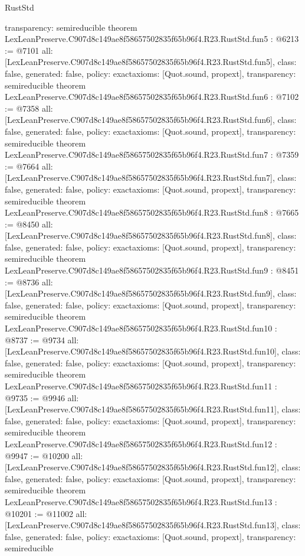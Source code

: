 \begin{lexlean}{RustStd}
\begin{coremodule}
{  transparency: semireducible
}
theorem LexLeanPreserve.C907d8c149ae8f58657502835f65b96f4.R23.RustStd.fun5 : @6213 := @7101 {
  all: [LexLeanPreserve.C907d8c149ae8f58657502835f65b96f4.R23.RustStd.fun5],
  class: false,
  generated: false,
  policy: exact{axioms: [Quot.sound, propext]},
  transparency: semireducible
}
theorem LexLeanPreserve.C907d8c149ae8f58657502835f65b96f4.R23.RustStd.fun6 : @7102 := @7358 {
  all: [LexLeanPreserve.C907d8c149ae8f58657502835f65b96f4.R23.RustStd.fun6],
  class: false,
  generated: false,
  policy: exact{axioms: [Quot.sound, propext]},
  transparency: semireducible
}
theorem LexLeanPreserve.C907d8c149ae8f58657502835f65b96f4.R23.RustStd.fun7 : @7359 := @7664 {
  all: [LexLeanPreserve.C907d8c149ae8f58657502835f65b96f4.R23.RustStd.fun7],
  class: false,
  generated: false,
  policy: exact{axioms: [Quot.sound, propext]},
  transparency: semireducible
}
theorem LexLeanPreserve.C907d8c149ae8f58657502835f65b96f4.R23.RustStd.fun8 : @7665 := @8450 {
  all: [LexLeanPreserve.C907d8c149ae8f58657502835f65b96f4.R23.RustStd.fun8],
  class: false,
  generated: false,
  policy: exact{axioms: [Quot.sound, propext]},
  transparency: semireducible
}
theorem LexLeanPreserve.C907d8c149ae8f58657502835f65b96f4.R23.RustStd.fun9 : @8451 := @8736 {
  all: [LexLeanPreserve.C907d8c149ae8f58657502835f65b96f4.R23.RustStd.fun9],
  class: false,
  generated: false,
  policy: exact{axioms: [Quot.sound, propext]},
  transparency: semireducible
}
theorem LexLeanPreserve.C907d8c149ae8f58657502835f65b96f4.R23.RustStd.fun10 : @8737 := @9734 {
  all: [LexLeanPreserve.C907d8c149ae8f58657502835f65b96f4.R23.RustStd.fun10],
  class: false,
  generated: false,
  policy: exact{axioms: [Quot.sound, propext]},
  transparency: semireducible
}
theorem LexLeanPreserve.C907d8c149ae8f58657502835f65b96f4.R23.RustStd.fun11 : @9735 := @9946 {
  all: [LexLeanPreserve.C907d8c149ae8f58657502835f65b96f4.R23.RustStd.fun11],
  class: false,
  generated: false,
  policy: exact{axioms: [Quot.sound, propext]},
  transparency: semireducible
}
theorem LexLeanPreserve.C907d8c149ae8f58657502835f65b96f4.R23.RustStd.fun12 : @9947 := @10200 {
  all: [LexLeanPreserve.C907d8c149ae8f58657502835f65b96f4.R23.RustStd.fun12],
  class: false,
  generated: false,
  policy: exact{axioms: [Quot.sound, propext]},
  transparency: semireducible
}
theorem LexLeanPreserve.C907d8c149ae8f58657502835f65b96f4.R23.RustStd.fun13 : @10201 := @11002 {
  all: [LexLeanPreserve.C907d8c149ae8f58657502835f65b96f4.R23.RustStd.fun13],
  class: false,
  generated: false,
  policy: exact{axioms: [Quot.sound, propext]},
  transparency: semireducible
}
\end{coremodule}
\end{lexlean}
